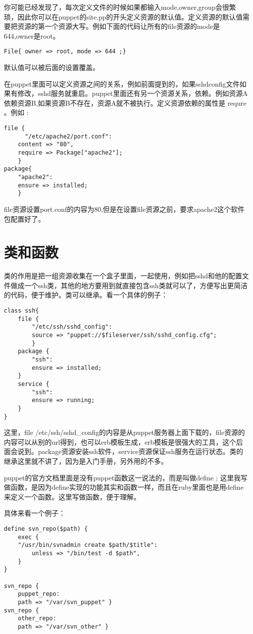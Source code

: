你可能已经发现了，每次定义文件的时候如果都输入mode,owner,group会很繁琐，因此你可以在puppet的site.pp的开头定义资源的默认值。定义资源的默认值需要把资源的第一个资源大写。例如下面的代码让所有的file资源的mode是644,owner是root。
\msyh \begin{lstlisting}
File{ owner => root, mode => 644 ;}
\end{lstlisting} \song
默认值可以被后面的设置覆盖。
\par

在puppet里面可以定义资源之间的关系，例如前面提到的，如果sshdconfig文件如果有修改，sshd服务就重启。puppet里面还有另一个资源关系，依赖。例如资源A依赖资源B,如果资源B不存在，资源A就不被执行。定义资源依赖的属性是 requre 。例如 :
\msyh \begin{lstlisting}
file { 
      "/etc/apache2/port.conf":
	content => "80",
	require => Package["apache2"];
	}
package{
	"apache2":
	ensure => installed;
	}
\end{lstlisting} \song

file资源设置port.conf的内容为80,但是在设置file资源之前，要求apache2这个软件包配置好了。

\section{\msyh 类和函数}
类的作用是把一组资源收集在一个盒子里面，一起使用，例如把sshd和他的配置文件做成一个ssh类，其他的地方要用到就直接包含ssh类就可以了，方便写出更简洁的代码，便于维护。类可以继承。看一个具体的例子：
\msyh \begin{lstlisting}
class ssh{
	file { 
		"/etc/ssh/sshd_config":
		source => "puppet://$fileserver/ssh/sshd_config.cfg";
		}
	package { 
		"ssh":
		ensure => installed;
	}
	service {
		"ssh":
		ensure => running;
	}
}
\end{lstlisting} \song
这里，file /etc/ssh/sshd\_config的内容是从puppet服务器上面下载的，file资源的内容可以从别的url得到，也可以erb模板生成，erb模板是很强大的工具，这个后面会说到。package资源安装ssh软件，service资源保证ssh服务在运行状态。类的继承这里就不讲了，因为是入门手册，另外用的不多。
\par
puppet的官方文档里面是没有puppet函数这一说法的，而是叫做define ; 这里我写做函数，是因为define实现的功能其实和函数一样，而且在ruby里面也是用define来定义一个函数。这里写做函数，便于理解。\par
具体来看一个例子：
\newpage
\msyh \begin{lstlisting}
define svn_repo($path) {
    exec { 
	"/usr/bin/svnadmin create $path/$title":
        unless => "/bin/test -d $path",
    }
}

svn_repo { 
	puppet_repo: 
	path => "/var/svn_puppet" }
svn_repo { 
	other_repo:  
	path => "/var/svn_other" }
\end{lstlisting} \song


